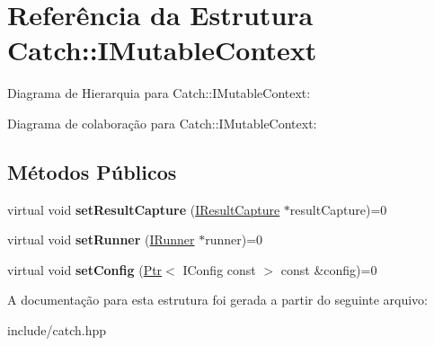 \hypertarget{structCatch_1_1IMutableContext}{}\section{Referência da Estrutura Catch\+:\+:I\+Mutable\+Context}
\label{structCatch_1_1IMutableContext}


Diagrama de Hierarquia para Catch\+:\+:I\+Mutable\+Context\+:


Diagrama de colaboração para Catch\+:\+:I\+Mutable\+Context\+:
\subsection*{Métodos Públicos}
\begin{DoxyCompactItemize}
\item 
virtual void {\bfseries set\+Result\+Capture} (\hyperlink{structCatch_1_1IResultCapture}{I\+Result\+Capture} $\ast$result\+Capture)=0\hypertarget{structCatch_1_1IMutableContext_a4a80afd0525b7def21bee8d9b48f2d39}{}\label{structCatch_1_1IMutableContext_a4a80afd0525b7def21bee8d9b48f2d39}

\item 
virtual void {\bfseries set\+Runner} (\hyperlink{structCatch_1_1IRunner}{I\+Runner} $\ast$runner)=0\hypertarget{structCatch_1_1IMutableContext_af2e53b1dea4527a2587cff266a730f6e}{}\label{structCatch_1_1IMutableContext_af2e53b1dea4527a2587cff266a730f6e}

\item 
virtual void {\bfseries set\+Config} (\hyperlink{classCatch_1_1Ptr}{Ptr}$<$ I\+Config const  $>$ const \&config)=0\hypertarget{structCatch_1_1IMutableContext_a04ae4f4219a481a7bf658d9fd445bc1d}{}\label{structCatch_1_1IMutableContext_a04ae4f4219a481a7bf658d9fd445bc1d}

\end{DoxyCompactItemize}


A documentação para esta estrutura foi gerada a partir do seguinte arquivo\+:\begin{DoxyCompactItemize}
\item 
include/catch.\+hpp\end{DoxyCompactItemize}
